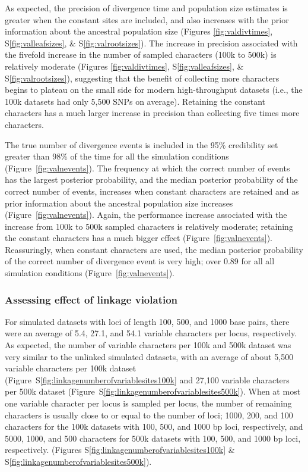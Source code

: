 As expected, the precision of divergence time and population size estimates
is greater when the constant sites are included, and also increases
with the prior information about the ancestral population size
(Figures \ref{fig:valdivtimes}, S\ref{fig:valleafsizes}, \&
S\ref{fig:valrootsizes}).
The increase in precision associated with the fivefold increase in 
the number of sampled characters (100k to 500k) is relatively moderate
(Figures \ref{fig:valdivtimes}, S\ref{fig:valleafsizes}, \&
S\ref{fig:valrootsizes}),
suggesting that the benefit of collecting more characters begins to plateau on
the small side for modern high-throughput datasets (i.e., the 100k datasets had
only 5,500 SNPs on average).
Retaining the constant characters has a much larger increase in precision
than collecting five times more characters.

The true number of divergence events is included in the 95\% credibility set
greater than 98\% of the time for all the simulation conditions
(Figure~\ref{fig:valnevents}).
The frequency at which the correct number of events has the largest posterior
probability, and the median posterior probability of the correct number of
events,
increases when constant characters are retained and as prior information about
the ancestral population size increases 
(Figure~\ref{fig:valnevents}).
Again, the performance increase associated with the increase from 100k to 500k
sampled characters is relatively moderate; retaining the constant characters
has a much bigger effect
(Figure~\ref{fig:valnevents}).
Reassuringly, when constant characters are used, the median posterior
probability of the correct number of divergence event is very high; over 0.89
for all all simulation conditions
(Figure~\ref{fig:valnevents}).



\subsubsection{Assessing effect of linkage violation}

For simulated datasets with loci of length 100, 500, and 1000 base pairs, there
were an average of 5.4, 27.1, and 54.1 variable characters per locus,
respectively.
As expected, the number of variable characters per 100k and 500k dataset
was very similar to the unlinked simulated datasets, with an average of
about
5,500 variable characters per 100k dataset
(Figure~S\ref{fig:linkagenumberofvariablesites100k}
and
27,100 variable characters per 500k dataset
(Figure~S\ref{fig:linkagenumberofvariablesites500k}).
When at most one variable character per locus is sampled per locus, the
number of remaining characters is usually close to or equal to the
number of loci;
1000, 200, and 100 characters for the 100k datasets
with 100, 500, and 1000 bp loci, respectively, and
5000, 1000, and 500 characters for 500k datasets
with 100, 500, and 1000 bp loci, respectively.
(Figures
S\ref{fig:linkagenumberofvariablesites100k}
\&
S\ref{fig:linkagenumberofvariablesites500k}).

